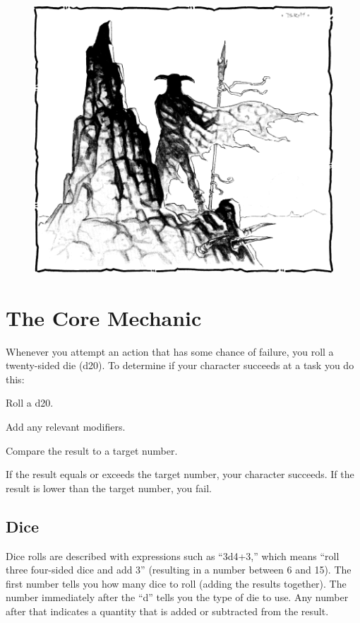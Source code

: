 \begin{figure}[b!]
\centering
\includegraphics[width=\textwidth-5mm]{images/adventurer-2.png}
\WOTC
\end{figure}

\section{The Core Mechanic}
Whenever you attempt an action that has some chance of failure, you roll a twenty-sided die (d20). To determine if your character succeeds at a task you do this:

\begin{itemize*}
\item Roll a d20.
\item Add any relevant modifiers.
\item Compare the result to a target number.
\item If the result equals or exceeds the target number, your character succeeds. If the result is lower than the target number, you fail.
\end{itemize*}

\subsection{Dice}
Dice rolls are described with expressions such as ``3d4+3,'' which means ``roll three four-sided dice and add 3'' (resulting in a number between 6 and 15). The first number tells you how many dice to roll (adding the results together). The number immediately after the ``d'' tells you the type of die to use. Any number after that indicates a quantity that is added or subtracted from the result.

